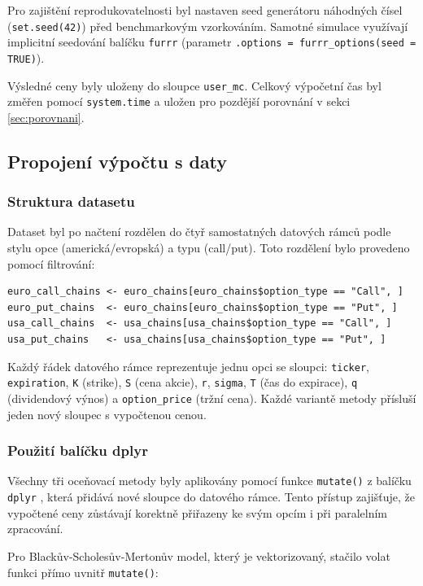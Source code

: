 Pro zajištění reprodukovatelnosti byl nastaven seed generátoru náhodných čísel (\texttt{set.seed(42)}) před benchmarkovým vzorkováním. Samotné simulace využívají implicitní seedování balíčku \texttt{furrr} (parametr \texttt{.options = furrr\_options(seed = TRUE)}).

Výsledné ceny byly uloženy do sloupce \texttt{user\_mc}. Celkový výpočetní čas byl změřen pomocí \texttt{system.time} a uložen pro pozdější porovnání v sekci \ref{sec:porovnani}.

\subsection{Propojení výpočtu s daty}

\subsubsection{Struktura datasetu}

Dataset byl po načtení rozdělen do čtyř samostatných datových rámců podle stylu opce (americká/evropská) a typu (call/put). Toto rozdělení bylo provedeno pomocí filtrování:

\begin{verbatim}
euro_call_chains <- euro_chains[euro_chains$option_type == "Call", ]
euro_put_chains  <- euro_chains[euro_chains$option_type == "Put", ]
usa_call_chains  <- usa_chains[usa_chains$option_type == "Call", ]
usa_put_chains   <- usa_chains[usa_chains$option_type == "Put", ]
\end{verbatim}

Každý řádek datového rámce reprezentuje jednu opci se sloupci: \texttt{ticker}, \texttt{expiration}, \texttt{K} (strike), \texttt{S} (cena akcie), \texttt{r}, \texttt{sigma}, \texttt{T} (čas do expirace), \texttt{q} (dividendový výnos) a \texttt{option\_price} (tržní cena). Každé variantě metody přísluší jeden nový sloupec s vypočtenou cenou.

\subsubsection{Použití balíčku dplyr}

Všechny tři oceňovací metody byly aplikovány pomocí funkce \texttt{mutate()} z balíčku \texttt{dplyr} \citep{dplyr}, která přidává nové sloupce do datového rámce. Tento přístup zajišťuje, že vypočtené ceny zůstávají korektně přiřazeny ke svým opcím i při paralelním zpracování.

Pro Blackův-Scholesův-Mertonův model, který je vektorizovaný, stačilo volat funkci přímo uvnitř \texttt{mutate()}:

